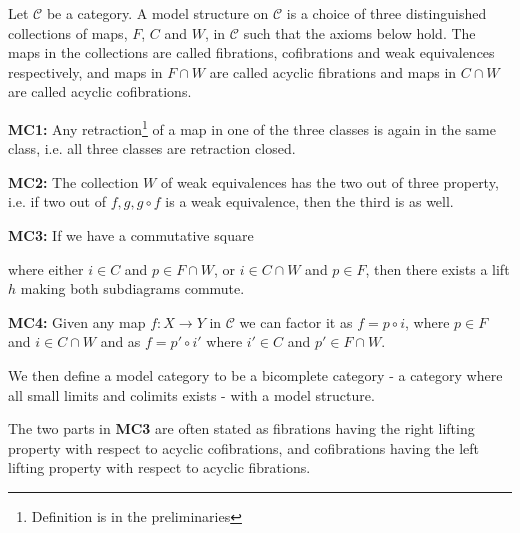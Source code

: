 \begin{definition}
Let $\mathcal{C}$ be a category. A model structure on $\mathcal{C}$ is a choice of three distinguished collections of maps, $F$, $C$ and $W$, in $\mathcal{C}$
such that the axioms below hold. The maps in the collections are called fibrations, cofibrations and weak equivalences respectively, and maps in $F\cap W$ are called acyclic fibrations and maps in $C\cap W$ are called acyclic cofibrations. 

\textbf{MC1:}
Any retraction\footnote{Definition is in the preliminaries} of a map in one of the three classes is again in the same class, i.e. all three classes are retraction closed. 

\textbf{MC2:}
The collection $W$ of weak equivalences has the two out of three property, i.e. if two out of $f, g, g\circ f$ is a weak equivalence, then the third is as well.

\textbf{MC3:}
If we have a commutative square 

\begin{center}
\end{center}

where either $i\in C$ and $p\in F\cap W$, or $i\in C\cap W$ and $p\in F$, then there exists a lift $h$ making both subdiagrams commute.

\textbf{MC4:}
Given any map $f:X\longrightarrow Y$ in $\mathcal{C}$ we can factor it as $f=p\circ i$, where $p\in F$ and $i\in C\cap W$ and as $f=p'\circ i'$ where $i'\in C$ and $p'\in F\cap W$. 
\end{definition}

We then define a model category to be a bicomplete category - a category where all small limits and colimits exists - with a model structure. 

The two parts in \textbf{MC3} are often stated as fibrations having the right lifting property with respect to acyclic cofibrations, and cofibrations having the left lifting property with respect to acyclic fibrations. 


